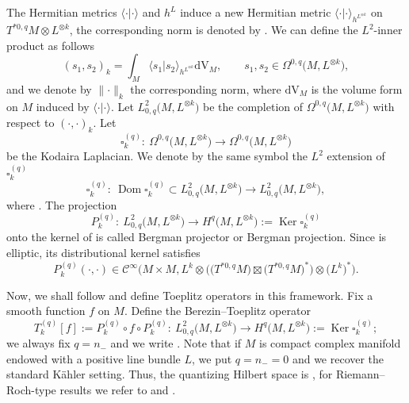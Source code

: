 \documentclass[10pt,a4paper]{amsart}
\numberwithin{equation}{section}
\newcommand{\To}{\rightarrow}
\begin{document}
	 The Hermitian metrics $\langle \cdot | \cdot \rangle$ and $h^L$ induce a new Hermitian metric $\langle \cdot | \cdot \rangle_{h^{L^{\otimes k}}}$ on $T^{*0,q}M\otimes L^{\otimes k}$, the corresponding norm is denoted by . We can define the $L^2$-inner product as follows
	 \[(s_1,s_2)_k=\int_M \langle s_1 | s_2 \rangle_{h^{L^{\otimes k}}} \mathrm{dV}_M,\qquad s_1, s_2\in \Omega^{0,q}\bigl(M,L^{\otimes k}\bigr) , \]
	 and we denote by $\lVert \cdot \rVert_{k}$ the corresponding norm, where $\mathrm{dV}_M$ is the volume form on $M$ induced by $\langle \cdot | \cdot \rangle$.
	 Let $L^2_{0,q}\bigl(M,L^{\otimes k}\bigr)$ be the completion of $\Omega^{0,q}\bigl(M,L^{\otimes k}\bigr)$ with respect to $(\cdot ,\cdot)_k$. Let
 \[
 \square^{(q)}_k\colon\ \Omega^{0,q}\bigl(M,L^{\otimes k}\bigr)\To\Omega^{0,q}\bigl(M,L^{\otimes k}\bigr)
 \]
 be the Kodaira Laplacian. We denote by the same symbol the $L^2$ extension of $\square^{(q)}_k$
	 \[\square^{(q)}_k\colon\ \operatorname{Dom}\square^{(q)}_k\subset L^2_{0,q}\bigl(M,L^{\otimes k}\bigr)\To L^2_{0,q}\bigl(M,L^{\otimes k}\bigr),\]
	 where
.
	 The projection
	 \[ P^{(q)}_k \colon\ L^2_{0,q}\bigl(M,L^{\otimes k}\bigr) \rightarrow H^q\bigl(M,L^{\otimes k}\bigr):=\operatorname{Ker}\square^{(q)}_k
\]
	 onto the kernel of  is called Bergman projector or Bergman projection. Since  is elliptic, its distributional kernel satisfies
	 \[P^{(q)}_k( \cdot , \cdot )\in\mathcal{C}^{\infty}\bigl(M\times M, L^k\otimes \bigl(\bigl(T^{*0,q}M\bigr)\boxtimes \bigl(T^{*0,q}M\bigr)^*\bigr)\otimes \bigl(L^k\bigr)^*\bigr) . \]

Now, we shall follow \cite{hsma1} and define Toeplitz operators in this framework. Fix a smooth function $f$ on $M$. Define the Berezin--Toeplitz operator
	 \[T^{(q)}_{k}[f]:= P^{(q)}_k\circ f \circ P^{(q)}_k \colon\ L^2_{0,q}\bigl(M,L^{\otimes k}\bigr) \rightarrow H^q\bigl(M,L^{\otimes k}\bigr):=\operatorname{Ker}\square^{(q)}_k ; \]
	 we always fix $q=n_-$ and we write . Note that if $M$ is compact complex manifold endowed with a positive line bundle $L$, we put $q=n_-=0$ and we recover the standard K\"ahler setting. Thus, the quantizing Hilbert space is , for Riemann--Roch-type results we refer to \cite{hsma1} and \cite[Section~1.2]{gh2}.
\end{document}
